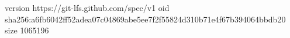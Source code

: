 version https://git-lfs.github.com/spec/v1
oid sha256:a6fb6042ff52adea07c04869abe5ee7f2f55824d310b71e4f67b394064bbdb20
size 1065196
